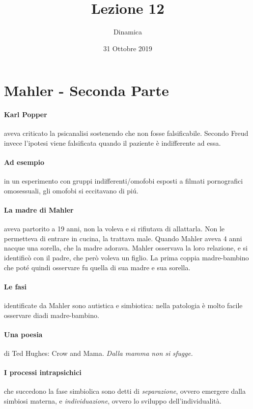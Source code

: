 \documentclass[12pt, a4paper]{article}
\title{Lezione 12}
\date{31 Ottobre 2019}
\author{Dinamica}
\begin{document}
\maketitle

\section{Mahler - Seconda Parte}
\paragraph{Karl Popper} aveva criticato la psicanalisi sostenendo che non fosse falsificabile. Secondo Freud invece l'ipotesi viene falsificata quando il paziente è indifferente ad essa.

\paragraph{Ad esempio} in un esperimento con gruppi indifferenti/omofobi esposti a filmati pornografici omosessuali, gli omofobi si eccitavano di pi\'u.

\paragraph{La madre di Mahler} aveva partorito a 19 anni, non la voleva e si rifiutava di allattarla. Non le permetteva di entrare in cucina, la trattava male. Quando Mahler aveva 4 anni nacque una sorella, che la madre adorava. Mahler osservava la loro relazione, e si identificò con il padre, che però voleva un figlio. La prima coppia madre-bambino che pot\'e quindi osservare fu quella di sua madre e sua sorella.

\paragraph{Le fasi} identificate da Mahler sono autistica e simbiotica: nella patologia \`e molto facile osservare diadi madre-bambino.

\paragraph{Una poesia} di Ted Hughes: Crow and Mama. \emph{Dalla mamma non si sfugge.}

\paragraph{I processi intrapsichici} che succedono la fase simbiolica sono detti di \emph{separazione}, ovvero emergere dalla simbiosi materna, e \emph{individuazione}, ovvero lo sviluppo dell'individualit\`a.
\end{document}
